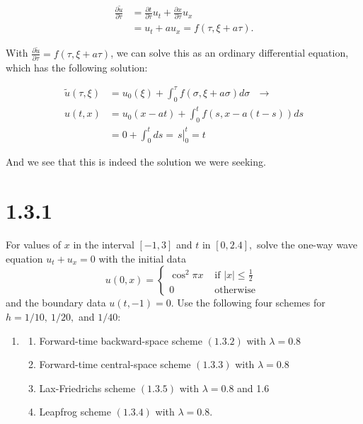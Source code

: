\documentclass[12pt]{article}
\begin{document}
\begin{equation*}
\begin{aligned}
	 \frac{\partial\tilde{u}}{\partial\tau} &= \frac{\partial t}{\partial\tau}u_t + \frac{\partial x}{\partial\tau}u_x\\
	 &= u_t + au_x = f(\tau, \xi+a\tau).
\end{aligned}
\end{equation*}

\noindent With $\frac{\partial\tilde{u}}{\partial\tau}=f(\tau, \xi+a\tau)$, we can solve this as an ordinary differential equation, which has the following solution:

\begin{equation*}
\begin{aligned}
	\tilde{u}(\tau,\xi)& = u_0(\xi) + \int_0^\tau f(\sigma, \xi+a\sigma) d\sigma ~~~ \longrightarrow \\
	u(t,x) &= u_0(x-at) + \int_0^t f(s,x-a(t-s)) ds\\
	&= 0 + \int_0^t ds = \left.\frac{}{}s\right|_0^t = t
\end{aligned}
\end{equation*}

And we see that this is indeed the solution we were seeking.




\section*{1.3.1}

For values of $x$ in the interval $[-1,3]$ and $t$ in $[0,2.4],$ solve the one-way wave equation $u_{t}+u_{x}=0$ with the initial data
$$u(0, x)=\left\{\begin{array}{ll}
{\cos ^{2} \pi x} & {\text { if }|x| \leq \frac{1}{2}} \\
{0} & {\text { otherwise }}
\end{array}\right.$$
and the boundary data $u(t,-1)=0.$
Use the following four schemes for $h=1 / 10,~1 / 20,$ and $1 / 40$:
\begin{enumerate}
	\item
	\begin{enumerate}
		\item Forward-time backward-space scheme $(1.3 .2)$ with $\lambda=0.8$
		\item Forward-time central-space scheme $(1.3 .3)$ with $\lambda=0.8$
		\item Lax-Friedrichs scheme $(1.3 .5)$ with $\lambda=0.8$ and 1.6
		\item Leapfrog scheme $(1.3 .4)$ with $\lambda=0.8$.
	\end{enumerate}
\end{enumerate}
\end{document}
